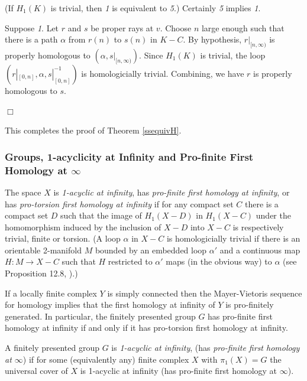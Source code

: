 \documentclass[12pt]{article}
\newenvironment{proof}{\addvspace{12pt}\noindent{\bf Proof:}}{
$\Box$\par\addvspace{12pt}}
\begin{document}
\begin{proof} (If $H_1(K)$ is trivial, then {\it 1} is equivalent to {\it 5}.) 
Certainly {\it 5} implies {\it 1}. 

Suppose {\it 1}. Let $r$ and $s$ be proper rays at $v$. Choose $n$ large enough such that there is a path $\alpha$ from $r(n)$ to $s(n)$ in $K-C$. By hypothesis, $r|_{[n,\infty)}$ is properly homologous to $(\alpha, s|_{[n,\infty)})$. Since $H_1(K)$ is trivial, the loop $(r|_{[0,n]}, \alpha, s|_{[0,n]}^{-1})$ is homologicially trivial. Combining, we have $r$ is properly homologous to $s$. 
\end{proof} 
\noindent This completes the proof of Theorem \ref{ssequivH}.



\subsubsection{Groups, 1-acyclicity at Infinity and Pro-finite First Homology at $\infty$} \label{ac1}

The space $X$ is {\it 1-acyclic at infinity}, has {\it pro-finite first homology at infinity}, or has {\it pro-torsion first homology at infinity}  if for any compact set $C$ there is a compact set $D$ such that the image of $H_1(X-D)$ in $H_1(X-C)$ under the homomorphism induced by the inclusion of $X-D$ into $X-C$ is respectively trivial, finite or torsion.  
(A loop $\alpha$ in $X-C$ is homologicially trivial if there is an orientable 2-manifold $M$ bounded by an embedded loop $\alpha'$ and a continuous map $H:M\to X-C$ such that $H$ restricted to $\alpha'$ maps (in the obvious way) to $\alpha$ (see Proposition 12.8, \cite{GH81}).)

\medskip

 If a locally finite complex $Y$ is simply connected then the Mayer-Vietoris sequence for homology implies that the first homology at infinity of $Y$ is pro-finitely generated. In particular, the finitely presented group $G$ has pro-finite first homology at infinity if and only if it has pro-torsion first homology at infinity. 

\medskip

A finitely presented group $G$ is {\it 1-acyclic at infinity}, (has {\it pro-finite first homology at $\infty$}) if for some (equivalently any) finite complex $X$ with $\pi_1(X)=G$ the universal cover of $X$ is 1-acyclic at infinity (has pro-finite first homology at $\infty$). 
 
\end{document}
